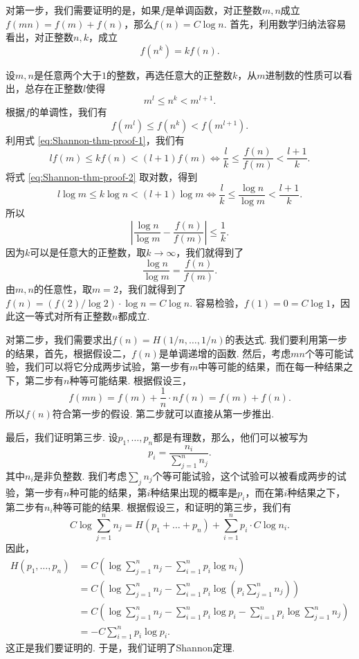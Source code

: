 对第一步，我们需要证明的是，如果$f$是单调函数，对正整数$m,n$成立$f(mn)=f(m)+f(n)$，那么$f(n)=C\log n$. 首先，利用数学归纳法容易看出，对正整数$n,k$，成立
\begin{equation}
    f(n^k)=kf(n).\label{eq:Shannon-thm-proof-1}
\end{equation}

设$m,n$是任意两个大于$1$的整数，再选任意大的正整数$k$，从$m$进制数的性质可以看出，总存在正整数$l$使得
\begin{equation}
    m^l\leq n^k < m^{l+1}.\label{eq:Shannon-thm-proof-2}
\end{equation}
根据$f$的单调性，我们有
\[
    f(m^l)\leq f(n^k) < f(m^{l+1}).
\]
利用式 \eqref{eq:Shannon-thm-proof-1}，我们有
\[
    lf(m)\leq kf(n) < (l+1)f(m)\iff \frac{l}{k}\leq \frac{f(n)}{f(m)} < \frac{l+1}{k}.
\]
将式 \eqref{eq:Shannon-thm-proof-2} 取对数，得到
\[
    l\log m\leq k\log n < (l+1)\log m\iff \frac{l}{k}\leq \frac{\log n}{\log m} < \frac{l+1}{k}.
\]
所以
\[
    \left|\frac{\log n}{\log m}-\frac{f(n)}{f(m)}\right|\leq\frac1k.
\]
因为$k$可以是任意大的正整数，取$k\to\infty$，我们就得到了
\[
    \frac{\log n}{\log m}=\frac{f(n)}{f(m)}.
\]
由$m,n$的任意性，取$m=2$，我们就得到了$f(n)=(f(2)/\log 2)\cdot \log n= C\log n$. 容易检验，$f(1)=0=C\log 1$，因此这一等式对所有正整数$n$都成立.

对第二步，我们需要求出$f(n)=H(1/n,\dots,1/n)$的表达式. 我们要利用第一步的结果，首先，根据假设二，$f(n)$是单调递增的函数. 然后，考虑$mn$个等可能试验，我们可以将它分成两步试验，第一步有$m$中等可能的结果，而在每一种结果之下，第二步有$n$种等可能结果. 根据假设三，
\[
f(mn)=f(m)+\frac{1}{n}\cdot nf(n)=f(m)+f(n).    
\]
所以$f(n)$符合第一步的假设. 第二步就可以直接从第一步推出.

最后，我们证明第三步. 设$p_1,\dots,p_n$都是有理数，那么，他们可以被写为
\[
    p_i=\frac{n_i}{\sum_{j=1}^n n_j}.
\]
其中$n_i$是非负整数. 我们考虑$\sum_j n_j$个等可能试验，这个试验可以被看成两步的试验，第一步有$n$种可能的结果，第$i$种结果出现的概率是$p_i$，而在第$i$种结果之下，第二步有$n_i$种等可能的结果. 根据假设三，和证明的第三步，我们有
\[
   C\log\sum_{j=1}^nn_j=H(p_1+\dots+p_n)+\sum_{i=1}^n p_i\cdot C\log n_i.
\]
因此，
\begin{align*}
    H(p_1,\dots,p_n)&=C\left(\log\sum_{j=1}^nn_j-\sum_{i=1}^n p_i\log n_i\right)\\
    &=C\left(\log\sum_{j=1}^nn_j-\sum_{i=1}^n p_i\log\left(p_i\sum_{j=1}^n n_j\right)\right)\\
    &=C\left(\log\sum_{j=1}^nn_j-\sum_{i=1}^n p_i\log p_i-\sum_{i=1}^n p_i\log\sum_{j=1}^n n_j\right)\\
    &=-C\sum_{i=1}^n p_i\log p_i.
\end{align*}
这正是我们要证明的. 于是，我们证明了Shannon定理.

